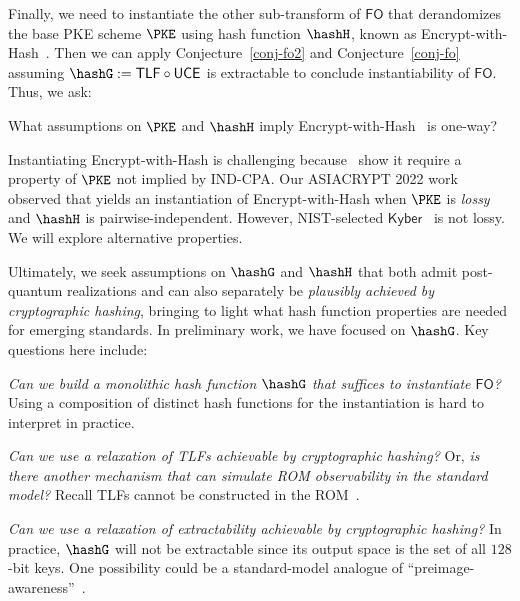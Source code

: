  Finally, we  need to instantiate the other sub-transform of $\mathsf{FO}$ that  derandomizes the base PKE scheme $\PKE$  using hash function $\hashH$, known as  Encrypt-with-Hash~\cite{C:BelBolOne07}. Then we can  apply Conjecture~\ref{conj-fo2}  and  Conjecture~\ref{conj-fo} assuming $\hashG := \mathsf{TLF} \circ \mathsf{UCE}$ is extractable to conclude instantiability of $\mathsf{FO}$. Thus, we ask:
 \begin{ques}
     What assumptions on $\PKE$ and $\hashH$ imply  Encrypt-with-Hash~\cite{C:BelBolOne07} is  one-way?
 \end{ques}
Instantiating Encrypt-with-Hash is challenging because~\cite{C:BrzFarMit14} show it require a property of $\PKE$ not implied by IND-CPA. Our ASIACRYPT 2022 work~\cite{AC:MurONeZah22} observed that \cite{AC:HemOst13} yields an instantiation of Encrypt-with-Hash when $\PKE$ is \emph{lossy}~\cite{EC:BelHofYil09} and $\hashH$ is pairwise-independent. However, NIST-selected $\mathsf{Kyber}$~\cite{kyber} is not lossy. We will explore alternative  properties.

  Ultimately, we  seek assumptions on $\hashG$ and $\hashH$ that both admit post-quantum realizations and can also separately be \emph{plausibly achieved by cryptographic hashing}, bringing to light what hash function properties are needed for emerging  standards. In preliminary work, we have focused on $\hashG$. Key questions here include:
\begin{newitemize} 
     \item  \emph{Can we build a \emph{monolithic} hash function $\hashG$ that suffices to instantiate $\mathsf{FO}$? }
     Using a composition of distinct hash functions for the instantiation is hard to interpret in practice.
     \item \emph{Can we use a relaxation of TLFs achievable by cryptographic hashing?} Or, \emph{is there another mechanism that can simulate ROM observability in the standard model?} Recall TLFs cannot be constructed in the ROM~\cite{TCC:FisRoh23}.
     \item \emph{Can we use a relaxation of  extractability  achievable by cryptographic hashing?} In practice, $\hashG$ will not be extractable since its output space is the set of all 
     $128$-bit keys. One  possibility could be a standard-model analogue of ``preimage-awareness''~\cite{EC:DodRisShr09}.  
\end{newitemize} 

